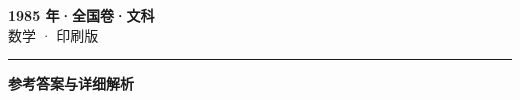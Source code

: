 \documentclass[zihao=5, a4paper]{ctexart}
\begin{document}
\begin{center}
  {\Large\bfseries 1985 年·全国卷·文科}\\[4pt]
  {\large 数学 · 印刷版}
\end{center}
\medskip
{}

\par\bigskip\hrule\bigskip
{}
\begin{center}{\large\bfseries 参考答案与详细解析}\end{center}
\smallskip

\end{document}
